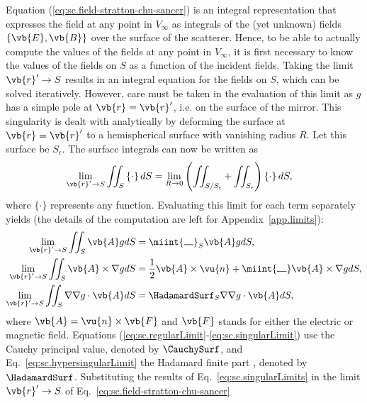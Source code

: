\documentclass[11pt,SymmetricalJury]{inrsthesis/inrsthesis}
\begin{document}
Equation (\ref{eq:sc.field-stratton-chu-sancer}) is an integral representation
that expresses the field at any point in $V_\infty$ as integrals of the (yet unknown)
fields $\{\vb{E},\vb{B}\}$ over the surface of the scatterer. Hence, to be able
to actually compute the values of the fields at any point in $V_\infty$, it is
first necessary to know the values of the fields on $S$ as a function of the
incident fields. Taking the limit $\vb{r}'\rightarrow S$
results in an integral equation for the fields on $S$, which can be solved iteratively. However,
care must be taken in the evaluation of this limit as $g$ has a simple pole at $\vb{r}=\vb{r}'$,
i.e. on the surface of the mirror.
This singularity is dealt with analytically by deforming the surface at $\vb{r}=\vb{r}'$
to a hemispherical surface with vanishing radius $R$. Let this surface be $S_\epsilon$. The
surface integrals can now be written as
  \begin{align}
    \lim_{\vb{r}'\rightarrow S}\iint_S \left\{\cdot\right\} dS
        &= \lim_{R\rightarrow0}\left(\iint_{S/S_\epsilon}+\iint_{S_\epsilon}\right) \left\{\cdot\right\}dS,
  \end{align}
where $\{\cdot\}$ represents any function. Evaluating this limit for each term separately
yields (the details of the computation are left for Appendix~\ref{app.limits}):
  \begin{subequations}
  \label{eq:sc.singularLimits}
  \begin{align}
    \lim_{\vb{r}'\rightarrow S}\iint_S \vb{A}g dS &= \miint{\rule{1em}{0.5pt}}_S \vb{A}g dS\label{eq:sc.regularLimit}, \\
    \lim_{\vb{r}'\rightarrow S}\iint_S \vb{A}\times\nabla gdS &= \frac{1}{2}\vb{A}\times\vu{n} + \miint{\rule{1em}{0.5pt}} \vb{A}\times\nabla gdS,\label{eq:sc.singularLimit}\\
    \lim_{\vb{r}'\rightarrow S}\iint_S \nabla\nabla g\cdot\vb{A}dS &= \HadamardSurf_S \nabla\nabla g \cdot\vb{A} dS\label{eq:sc.hypersingularLimit},
  \end{align}
  \end{subequations}
where $\vb{A}=\vu{n}\times\vb{F}$ and $\vb{F}$ stands for either the electric or
magnetic field. Equations (\ref{eq:sc.regularLimit}-\ref{eq:sc.singularLimit})
use the Cauchy principal value, denoted by $\CauchySurf$, and Eq.~\eqref{eq:sc.hypersingularLimit}
the Hadamard finite part \cite[Eq. (2.5)]{Blanchet2000}, denoted by $\HadamardSurf$.
Substituting the results of Eq.~\eqref{eq:sc.singularLimits} in the limit
$\vb{r}'\rightarrow S$ of Eq.~\eqref{eq:sc.field-stratton-chu-sancer}
\end{document}
